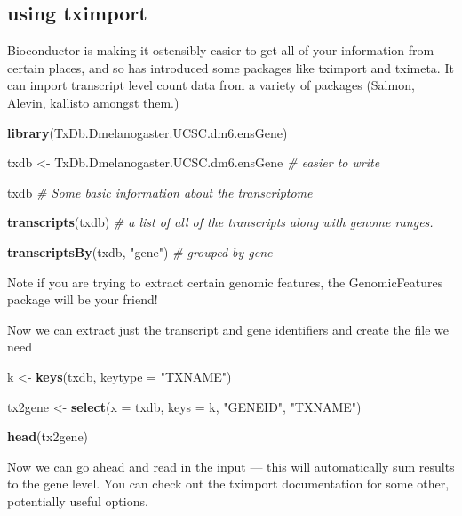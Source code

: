 \documentclass[
]{article}
\newenvironment{Shaded}{\begin{snugshade}}{\end{snugshade}}
\newcommand{\CommentTok}[1]{\textcolor[rgb]{0.56,0.35,0.01}{\textit{#1}}}
\newcommand{\DataTypeTok}[1]{\textcolor[rgb]{0.13,0.29,0.53}{#1}}
\newcommand{\KeywordTok}[1]{\textcolor[rgb]{0.13,0.29,0.53}{\textbf{#1}}}
\newcommand{\NormalTok}[1]{#1}
\newcommand{\StringTok}[1]{\textcolor[rgb]{0.31,0.60,0.02}{#1}}
\begin{document}
\hypertarget{using-tximport-1}{%
\subsection{using tximport}\label{using-tximport-1}}

Bioconductor is making it ostensibly easier to get all of your
information from certain places, and so has introduced some packages
like tximport and tximeta. It can import transcript level count data
from a variety of packages (Salmon, Alevin, kallisto amongst them.)

\begin{Shaded}
\begin{Highlighting}[]
\KeywordTok{library}\NormalTok{(TxDb.Dmelanogaster.UCSC.dm6.ensGene)}

\NormalTok{txdb <-}\StringTok{ }\NormalTok{TxDb.Dmelanogaster.UCSC.dm6.ensGene }\CommentTok{# easier to write}

\NormalTok{txdb }\CommentTok{# Some basic information about the transcriptome}

\KeywordTok{transcripts}\NormalTok{(txdb) }\CommentTok{# a list of all of the transcripts along with genome ranges.}

\KeywordTok{transcriptsBy}\NormalTok{(txdb, }\StringTok{"gene"}\NormalTok{) }\CommentTok{# grouped by gene}
\end{Highlighting}
\end{Shaded}

Note if you are trying to extract certain genomic features, the
GenomicFeatures package will be your friend!

Now we can extract just the transcript and gene identifiers and create
the file we need

\begin{Shaded}
\begin{Highlighting}[]
\NormalTok{k <-}\StringTok{ }\KeywordTok{keys}\NormalTok{(txdb, }\DataTypeTok{keytype =} \StringTok{"TXNAME"}\NormalTok{)}

\NormalTok{tx2gene <-}\StringTok{ }\KeywordTok{select}\NormalTok{(}\DataTypeTok{x =}\NormalTok{ txdb, }\DataTypeTok{keys =}\NormalTok{ k, }\StringTok{"GENEID"}\NormalTok{, }\StringTok{"TXNAME"}\NormalTok{)}

\KeywordTok{head}\NormalTok{(tx2gene)}
\end{Highlighting}
\end{Shaded}

Now we can go ahead and read in the input --- this will automatically
sum results to the gene level. You can check out the tximport
documentation for some other, potentially useful options.
\end{document}
